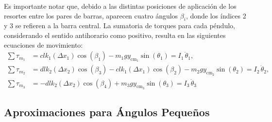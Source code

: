 Es importante notar que, debido a las distintas posiciones de
aplicaci\'on de los resortes entre los pares de barras, aparecen
cuatro \'angulos $\beta_i$, donde los \'indices 2 y 3 se refieren
a la barra central. La sumatoria de torques para cada
p\'endulo, considerando el sentido antihorario como positivo, resulta
en las siguientes ecuaciones de movimiento:
\begin{align}
  \sum \tau_{m_1} &= c l k_1 (\Delta x_1) \cos(\beta_1) - m_1 g y_{\text{cm}_1} \sin(\theta_1) = I_1 \, \ddot{\theta}_1 \label{eq:tau_m1}, \\
  \sum \tau_{m_2} &= d l k_2 (\Delta x_2) \cos(\beta_3) - c l k_1 (\Delta x_1) \cos(\beta_2) - m_2 g y_{\text{cm}_2} \sin(\theta_2) = I_2 \, \ddot{\theta}_2 \label{eq:tau_m2}, \\
  \sum \tau_{m_3} &= -d l k_2 (\Delta x_2) \cos(\beta_4) + m_3 g y_{\text{cm}_3} \sin(\theta_3) = I_3 \, \ddot{\theta}_3 \label{eq:tau_m3}
\end{align}

\subsection*{Aproximaciones para \'Angulos Peque\~nos}

